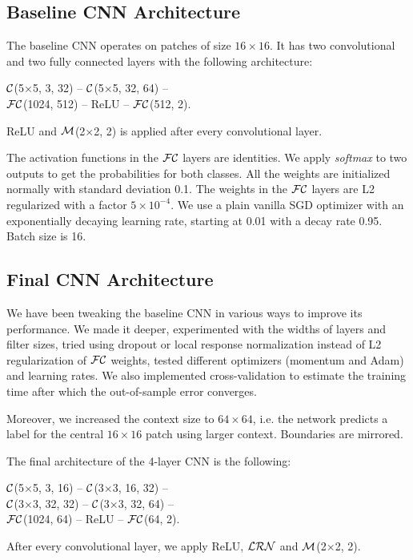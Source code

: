 \documentclass[10pt,conference,compsocconf]{IEEEtran}
\newcommand{\conv}[3]{$ \cal{C} $(#1$ \times  $#1, #2, #3)}
\newcommand{\maxpool}[2]{$ \cal{M} $(#1$ \times $#1, #2)}
\newcommand{\lrn}{$ \cal{LRN}~$}
\newcommand{\fc}[2]{$ \cal{FC} $(#1, #2)}
\begin{document}
\subsection{Baseline CNN Architecture}
\label{subsec:baselineCNN}
The baseline CNN operates on patches of size $16 \times 16$. It has two convolutional and two fully connected layers with the following architecture:
\begin{center}
	\conv{5}{3}{32} -- \conv{5}{32}{64} -- \\ 
	\fc{1024}{512} -- ReLU -- \fc{512}{2}.
\end{center}
ReLU and \maxpool{2}{2} is applied after every convolutional layer.

The activation functions in the $ \cal{FC} $ layers are identities. We apply \textit{softmax} to two outputs to get the probabilities for both classes. All the weights are initialized normally with standard deviation 0.1. The weights in the $ \cal{FC} $ layers are L2 regularized with a factor $ 5 \times 10^{-4} $. We use a plain vanilla SGD optimizer with an exponentially decaying learning rate, starting at 0.01 with a decay rate 0.95. Batch size is 16. 

\subsection{Final CNN Architecture}
\label{subsec:CNN}
We have been tweaking the baseline CNN in various ways to improve its performance. We made it deeper, experimented with the widths of layers and filter sizes, tried using dropout or local response normalization instead of L2 regularization of $ \cal{FC} $ weights, tested different optimizers (momentum and Adam) and learning rates. We also implemented cross-validation to estimate the training time after which the out-of-sample error converges.

Moreover, we increased the context size to $ 64\times64 $, i.e. the network predicts a label for the central $ 16\times16 $ patch using larger context. Boundaries are mirrored.

The final architecture of the 4-layer CNN is the following:
\begin{center}
	\conv{5}{3}{16} -- \conv{3}{16}{32} -- \\ 
	\conv{3}{32}{32} -- \conv{3}{32}{64} -- \\
	\fc{1024}{64} -- ReLU -- \fc{64}{2}.
\end{center}
After every convolutional layer, we apply ReLU, \lrn and \maxpool{2}{2}.
\end{document}
